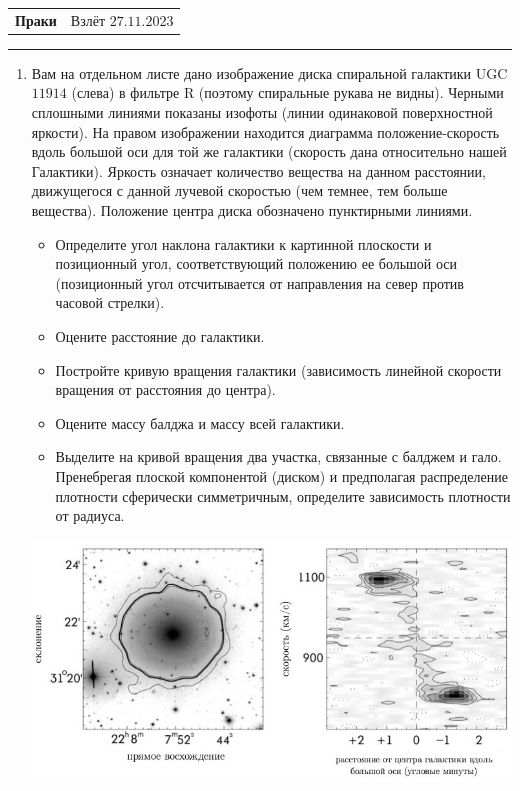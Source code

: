 \documentclass[12pt]{article}
\begin{document}
\begin{tabularx}{\textwidth}{Xr}
{\Large \textbf{Праки}} & Взлёт $27.11.2023$ \\
\end{tabularx}
\noindent\rule{\textwidth}{0.4pt}
\begin{enumerate}
    \item Вам на отдельном листе дано изображение диска спиральной галактики UGC $11914$ (слева) в фильтре R (поэтому спиральные рукава не видны). Черными сплошными линиями показаны изофоты (линии одинаковой поверхностной яркости). На правом изображении находится диаграмма положение-скорость вдоль большой оси для той же галактики (скорость дана относительно нашей Галактики). Яркость означает количество вещества на данном расстоянии, движущегося с данной лучевой скоростью (чем темнее, тем больше вещества). Положение центра диска обозначено пунктирными линиями.
    \begin{itemize}
        \item Определите угол наклона галактики к картинной плоскости и позиционный угол, соответствующий положению ее большой оси (позиционный угол отсчитывается от направления на север против часовой стрелки).
        \item Оцените расстояние до галактики.
        \item Постройте кривую вращения галактики (зависимость линейной скорости вращения от расстояния до центра).
        \item Оцените массу балджа и массу всей галактики.
        \item Выделите на кривой вращения два участка, связанные с балджем и гало. Пренебрегая плоской компонентой (диском) и предполагая распределение плотности сферически симметричным, определите зависимость плотности от радиуса.
    \end{itemize}
    \includegraphics[width = \linewidth]{img5.jpeg}

\end{enumerate}
\end{document}
